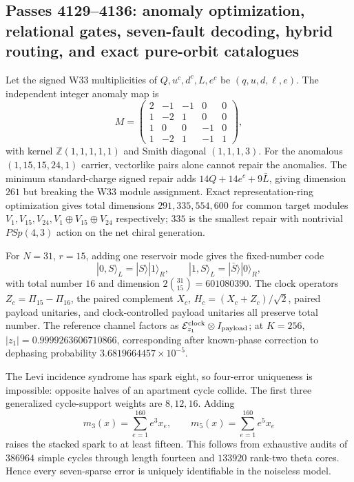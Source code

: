 \subsection{Passes 4129--4136: anomaly optimization, relational gates, seven-fault decoding, hybrid routing, and exact pure-orbit catalogues}

Let the signed W33 multiplicities of $Q,u^c,d^c,L,e^c$ be $(q,u,d,\ell,e)$.  The independent integer anomaly map is
\[
M=\begin{pmatrix}2&-1&-1&0&0\\1&-2&1&0&0\\1&0&0&-1&0\\1&-2&1&-1&1\end{pmatrix},
\]
with kernel $\mathbb Z(1,1,1,1,1)$ and Smith diagonal $(1,1,1,3)$.  For the anomalous $(1,15,15,24,1)$ carrier, vectorlike pairs alone cannot repair the anomalies.  The minimum standard-charge signed repair adds $14Q+14e^c+9\bar L$, giving dimension $261$ but breaking the W33 module assignment.  Exact representation-ring optimization gives total dimensions $291,335,554,600$ for common target modules $V_1,V_{15},V_{24},V_1\oplus V_{15}\oplus V_{24}$ respectively; $335$ is the smallest repair with nontrivial $PSp(4,3)$ action on the net chiral generation.

For $N=31$, $r=15$, adding one reservoir mode gives the fixed-number code
\[
|0,S\rangle_L=|S\rangle|1\rangle_R,\qquad |1,S\rangle_L=|\bar S\rangle|0\rangle_R,
\]
with total number $16$ and dimension $2\binom{31}{15}=601080390$.  The clock operators $Z_c=\Pi_{15}-\Pi_{16}$, the paired complement $X_c$, $H_c=(X_c+Z_c)/\sqrt2$, paired payload unitaries, and clock-controlled payload unitaries all preserve total number.  The reference channel factors as $\mathcal E_{z_1}^{\rm clock}\otimes I_{\rm payload}$; at $K=256$, $|z_1|=0.9999263606710866$, corresponding after known-phase correction to dephasing probability $3.6819664457\times10^{-5}$.

The Levi incidence syndrome has spark eight, so four-error uniqueness is impossible: opposite halves of an apartment cycle collide.  The first three generalized cycle-support weights are $8,12,16$.  Adding
\[
m_3(x)=\sum_{e=1}^{160}e^3x_e,\qquad m_5(x)=\sum_{e=1}^{160}e^5x_e
\]
raises the stacked spark to at least fifteen.  This follows from exhaustive audits of $386964$ simple cycles through length fourteen and $133920$ rank-two theta cores.  Hence every seven-sparse error is uniquely identifiable in the noiseless model.

